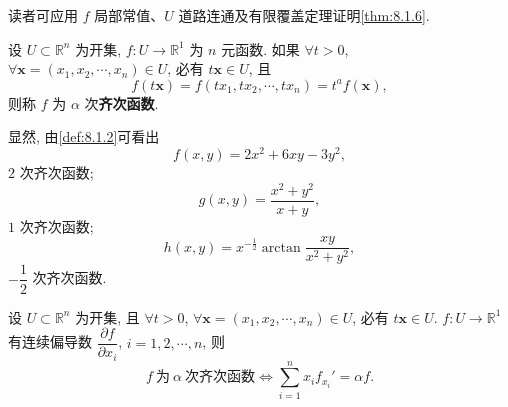 \begin{remark}\label{rem:8.1.1}
读者可应用 $f$ 局部常值、$U$ 道路连通及有限覆盖定理证明\cref{thm:8.1.6}.
\end{remark}

\begin{definition}\label{def:8.1.2}
设 $U \subset \mathbb{R}^{n}$ 为开集, $f: U \to \mathbb{R}^{1}$ 为 $n$ 元函数. 如果 $\forall t > 0$, $\forall \boldsymbol{x} = (x_{1}, x_{2}, \cdots, x_{n}) \in U$, 必有 $t\boldsymbol{x} \in U$, 且
\[
  f(t\boldsymbol{x}) = f(tx_{1}, tx_{2}, \cdots, tx_{n}) = t^{a}f(\boldsymbol{x}),
\]
则称 $f$ 为 $\alpha$ 次\textbf{齐次函数}.
\end{definition}

\begin{example}\label{ex:8.1.14}
显然, 由\cref{def:8.1.2}可看出
\[
  f(x, y) = 2x^{2} + 6xy - 3y^{2},
\]
$2$ 次齐次函数;
\[
  g(x, y) = \frac{x^{2} + y^{2}}{x + y},
\]
$1$ 次齐次函数;
\[
  h(x, y) = x^{-\frac{1}{2}}\arctan\frac{xy}{x^{2} + y^{2}},
\]
$-\dfrac{1}{2}$ 次齐次函数.
\end{example}

\begin{theorem}[Euler 定理]\label{thm:8.1.7}
设 $U \subset \mathbb{R}^{n}$ 为开集, 且 $\forall t > 0$, $\forall \boldsymbol{x} = (x_{1}, x_{2}, \cdots, x_{n}) \in U$, 必有 $t\boldsymbol{x} \in U$. $f: U \to \mathbb{R}^{1}$ 有连续偏导数 $\dfrac{\partial f}{\partial x_{i}}$, $i = 1, 2, \cdots, n$, 则
\[
  f\ \text{为}\ \alpha\ \text{次齐次函数} \iff \sum_{i = 1}^{n} x_{i}f_{x_{i}}' = \alpha f.
\]
\end{theorem}

